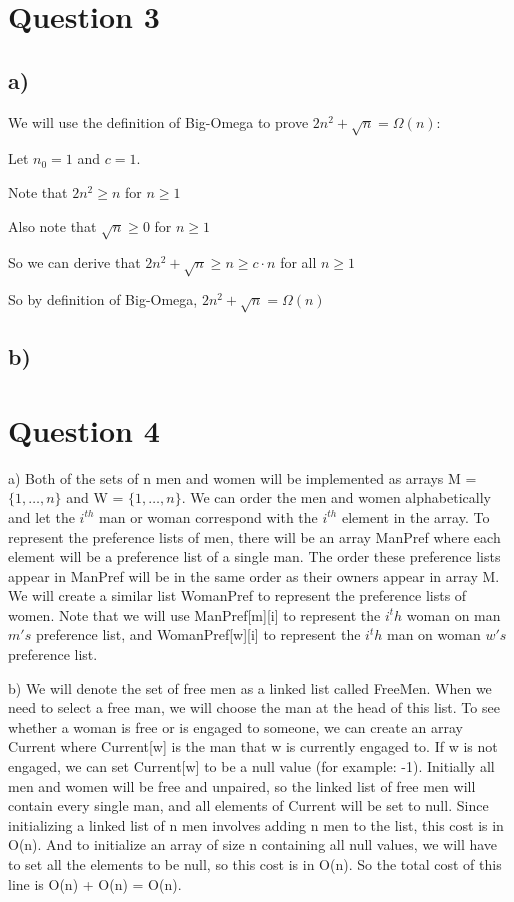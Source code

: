 \documentclass{article}
\begin{document}

\section*{Question 3}

\subsection*{a)}
We will use the definition of Big-Omega to prove $2n^2+\sqrt{n} = \Omega(n)$:

Let $n_0 = 1$ and $c = 1$.

Note that $ 2n^2 \geq n$ for $n \geq 1$

Also note that $\sqrt{n} \geq 0$ for $n \geq 1$

So we can derive that $2n^2+\sqrt{n} \geq n \geq c \cdot n$ for all $n \geq 1$

So by definition of Big-Omega, $2n^2+\sqrt{n} = \Omega(n)$

\subsection*{b)}

\section*{Question 4}
a) Both of the sets of n men and women will be implemented as arrays M = $\{1, \dots, n\}$ and W = $\{1, \dots, n\}$. We can order the men and women alphabetically and let the $i^{th}$ man or woman correspond with the $i^{th}$ element in the array. To represent the preference lists of men, there will be an array ManPref where each element will be a preference list of a single man. The order these preference lists appear in ManPref will be in the same order as their owners appear in array M. We will create a similar list WomanPref to represent the preference lists of women. Note that we will use ManPref[m][i] to represent the $i^th$ woman on man $m's$ preference list, and WomanPref[w][i] to represent the $i^th$ man on woman $w's$ preference list.

b) We will denote the set of free men as a linked list called FreeMen. When we need to select a free man, we will choose the man at the head of this list. To see whether a woman is free or is engaged to someone, we can create an array Current where Current[w] is the man that w is currently engaged to. If w is not engaged, we can set Current[w] to be a null value (for example: -1). Initially all men and women will be free and unpaired, so the linked list of free men will contain every single man, and all elements of Current will be set to null. 
Since initializing a linked list of n men involves adding n men to the list, this cost is in O(n).
And to initialize an array of size n containing all null values, we will have to set all the elements to be null, so this cost is in O(n).
So the total cost of this line is O(n) + O(n) = O(n).
\end{document}
